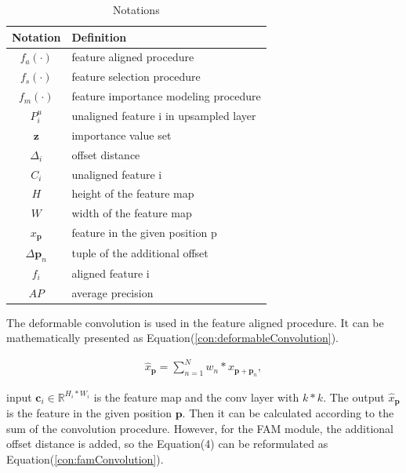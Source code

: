 \begin{table}[htb]
		\begin{center}
			\caption{Notations}\label{Notation}
			\begin{tabular}{|c|l|} %
				\toprule
				\textbf{Notation} & \textbf{Definition}\\
				\hline
				$f_a(·)$ & feature aligned procedure\\
				$f_s(·)$ & feature selection procedure\\
				$f_m(·)$ & feature importance modeling procedure\\
				$P^u_i$ & unaligned feature i in upsampled layer\\
				$\textbf{z}$ & importance value set\\
				$\Delta_i$ & offset distance\\
				$C_i$ & unaligned feature i\\
				$H$ & height of the feature map\\
				$W$ & width of the feature map\\
				$x_\textbf{p}$ & feature in the given position p\\
				$\Delta\textbf{p}_n$&tuple of the additional offset\\
				$f_i$&aligned feature i\\
				$AP$&average precision\\
				\bottomrule
			\end{tabular}
		\end{center}
	\end{table}

The deformable convolution is used in the feature aligned procedure. It can be mathematically presented as Equation(\ref{con:deformableConvolution}).



\begin{equation}
    \begin{aligned}
    \hat{x}_\textbf{p}= \sum_{n = 1}^{N}w_n * x_{\textbf{p}+\textbf{p}_n},
    \label{con:deformableConvolution}
    \end{aligned}
\end{equation}

input $\textbf{c}_i \in \mathbb{R}^{H_i * W_i}$ is the feature map and the conv layer with $k * k$. The output $\hat{x}_\textbf{p}$ is the feature in the given position $\textbf{p}$. Then it can be calculated according to the sum of the convolution procedure. However, for the FAM module, the additional offset distance is added, so the Equation(4) can be reformulated as Equation(\ref{con:famConvolution}).

